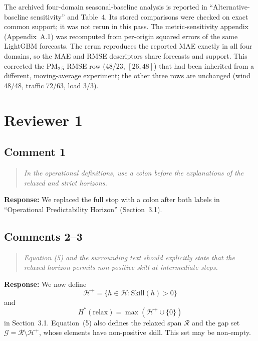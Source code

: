 \documentclass[11pt,a4paper]{article}
\let\originalsubsection\subsection
\renewcommand{\subsection}{\Needspace{9\baselineskip}\originalsubsection}
\let\originalsection\section
\renewcommand{\section}{\Needspace{12\baselineskip}\originalsection}
\newenvironment{reviewcomment}
  {\begin{quote}\itshape}
  {\end{quote}}
\newcommand{\response}{\noindent\textbf{Response:} }
\begin{document}
The archived four-domain seasonal-baseline analysis is reported in
``Alternative-baseline sensitivity'' and Table~4. Its stored comparisons
were checked on exact common support; it was not rerun in this pass.
The metric-sensitivity appendix (Appendix~A.1) was recomputed from per-origin
squared errors of the same LightGBM forecasts. The rerun reproduces the reported
MAE exactly in all four domains, so the MAE and RMSE descriptors share forecasts
and support. This corrected the PM$_{2.5}$ RMSE row (48/23, $[26,48]$) that had
been inherited from a different, moving-average experiment; the other three rows
are unchanged (wind 48/48, traffic 72/63, load 3/3).


\section*{Reviewer 1}

\subsection*{Comment 1}

\begin{reviewcomment}
In the operational definitions, use a colon before the explanations of the
relaxed and strict horizons.
\end{reviewcomment}

\response
We replaced the full stop with a colon after both labels in
``Operational Predictability Horizon'' (Section~3.1).


\subsection*{Comments 2--3}

\begin{reviewcomment}
Equation (5) and the surrounding text should explicitly state that the relaxed
horizon permits non-positive skill at intermediate steps.
\end{reviewcomment}

\response
We now define
\[
\mathcal{H}^{+}
=
\{h\in\mathcal{H}:\mathrm{Skill}(h)>0\}
\]
and
\[
H^*(\mathrm{relax})
=
\max\left(\mathcal{H}^{+}\cup\{0\}\right)
\]
in Section~3.1. Equation~(5) also defines the relaxed span $\mathcal{R}$
and the gap set $\mathcal{G}=\mathcal{R}\setminus\mathcal{H}^{+}$,
whose elements have non-positive skill. This set may be non-empty.
\end{document}
